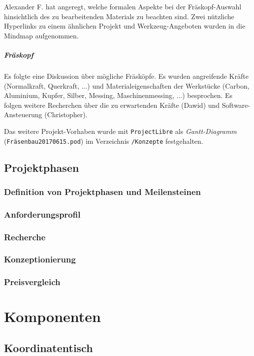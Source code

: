 \documentclass[
	a4paper,
	smallheadings,
	german,
	]
	{scrreprt}
\begin{document}
Alexander F. hat angeregt, welche formalen Aspekte bei der Fräskopf-Auswahl hinsichtlich des zu bearbeitenden Materials zu beachten sind.
Zwei nützliche Hyperlinks zu einem ähnlichen Projekt\autocite{:Herbert} und Werkzeug-Angeboten\autocite{:ZuJeddeloh} wurden in die Mindmap  aufgenommen.

\paragraph{Fräskopf}
Es folgte eine Diskussion über mögliche Fräsköpfe.
Es wurden angreifende Kräfte (Normalkraft, Querkraft, ...) und Materialeigenschaften der Werkstücke (Carbon, Aluminium, Kupfer, Silber, Messing, Maschinenmessing, ...)  besprochen.
Es folgen weitere Recherchen über die zu erwartenden Kräfte (Dawid) und Software-Ansteuerung (Christopher).

Das weitere Projekt-Vorhaben wurde mit \texttt{ProjectLibre} als \textit{Gantt-Diagramm} (\texttt{Fräsenbau20170615.pod}) im Verzeichnis \texttt{/Konzepte} festgehalten. 


\section{Projektphasen}
\subsection{Definition von Projektphasen und Meilensteinen}
\subsection{Anforderungsprofil}
\subsection{Recherche}
\subsection{Konzeptionierung}
\subsection{Preisvergleich}

\chapter{Komponenten}
\section{Koordinatentisch}
\end{document}
